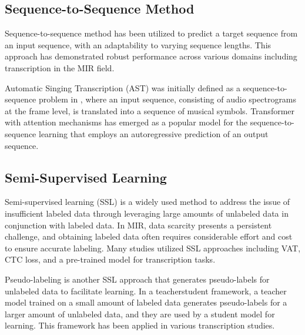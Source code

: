 \subsection{Sequence-to-Sequence Method}
Sequence-to-sequence method\cite{seq2seq} has been utilized to predict a target sequence from an input sequence, with an adaptability to varying sequence lengths. This approach has demonstrated robust performance across various domains\cite{s2s_amt, s2s_asr} including transcription in the MIR field. 

Automatic Singing Transcription (AST) was initially defined as a sequence-to-sequence problem in \cite{cs2s}, where an input sequence, consisting of audio spectrograms at the frame level, is translated into a sequence of musical symbols. 
Transformer\cite{transformer} with attention mechanisms has emerged as a popular model for the sequence-to-sequence learning that employs an autoregressive prediction of an output sequence. 


\subsection{Semi-Supervised Learning}
Semi-supervised learning (SSL) is a widely used method to address the issue of insufficient labeled data through leveraging large amounts of unlabeled data in conjunction with labeled data. 
In MIR, data scarcity presents a persistent challenge, and obtaining labeled data often requires considerable effort and cost to ensure accurate labeling. Many studies utilized SSL approaches including VAT\cite{vat}, CTC loss\cite{ctc}, and a pre-trained model\cite{jukebox} for transcription tasks\cite{vocano, ctc_note, notation1, notation2, notation3}.

Pseudo-labeling is another SSL approach that generates pseudo-labels for unlabeled data to facilitate learning. In a teacher\textendash student framework, a teacher model trained on a small amount of labeled data generates pseudo-labels for a larger amount of unlabeled data, and they are used by a student model for learning. This framework has been applied in various transcription studies\cite{adt, ssl_vocal,jdc_note}.